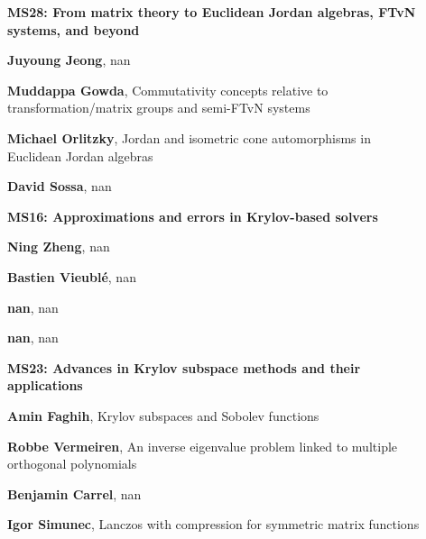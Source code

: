 \documentclass[ILAS2025-program.tex]{subfiles}
\begin{document}
\begin{description}
    \begin{description}
    \item[] {\color{mstitle}\textbf{MS28: From matrix theory to Euclidean Jordan algebras, FTvN systems, and beyond}} 
    \item[] \textbf{Juyoung Jeong}, nan
        \item[] \textbf{Muddappa Gowda}, Commutativity concepts relative to transformation/matrix groups and semi-FTvN systems
        \item[] \textbf{Michael Orlitzky}, Jordan and isometric cone automorphisms in Euclidean Jordan algebras
        \item[] \textbf{David Sossa}, nan
        \end{description}
    \begin{description}
    \item[] {\color{mstitle}\textbf{MS16: Approximations and errors in Krylov-based solvers}} 
    \item[] \textbf{Ning Zheng}, nan
        \item[] \textbf{Bastien Vieublé}, nan
        \item[] \textbf{nan}, nan
        \item[] \textbf{nan}, nan
        \end{description}
    \begin{description}
    \item[] {\color{mstitle}\textbf{MS23: Advances in Krylov subspace methods and their applications}} 
    \item[] \textbf{Amin Faghih}, Krylov subspaces and Sobolev functions
        \item[] \textbf{Robbe Vermeiren}, An inverse eigenvalue problem linked to multiple orthogonal polynomials

        \item[] \textbf{Benjamin Carrel}, nan
        \item[] \textbf{Igor Simunec}, Lanczos with compression for symmetric matrix functions
        \end{description}
    \end{description}
    \newpage
\end{document}

